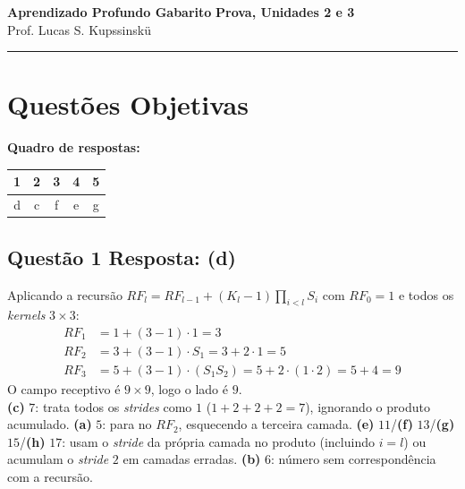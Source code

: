 \documentclass[11pt,a4paper]{article}
\begin{document}
{\Large\bfseries Aprendizado Profundo \textemdash{} Gabarito} \hfill \textbf{Prova, Unidades 2 e 3}\\
Prof. Lucas S. Kupssinskü

\rule{\linewidth}{0.8pt}

\section*{Questões Objetivas}

\textbf{Quadro de respostas:}
\begin{center}
\begin{tabular}{|c|c|c|c|c|}
\hline
1 & 2 & 3 & 4 & 5 \\\hline
d & c & f & e & g \\\hline
\end{tabular}
\end{center}

\color{blue}

\subsection*{Questão 1 \textemdash{} Resposta: (d)}
Aplicando a recursão $RF_l = RF_{l-1} + (K_l - 1)\prod_{i<l} S_i$ com $RF_0 = 1$ e todos os \textit{kernels} $3\times 3$:
\begin{align*}
    RF_1 &= 1 + (3-1)\cdot 1 = 3 \\
    RF_2 &= 3 + (3-1)\cdot S_1 = 3 + 2\cdot 1 = 5 \\
    RF_3 &= 5 + (3-1)\cdot (S_1 S_2) = 5 + 2\cdot(1\cdot 2) = 5 + 4 = 9
\end{align*}
O campo receptivo é $9 \times 9$, logo o lado é $9$.\\
\textbf{(c)} $7$: trata todos os \textit{strides} como $1$ ($1 + 2 + 2 + 2 = 7$), ignorando o produto acumulado.
\textbf{(a)} $5$: para no $RF_2$, esquecendo a terceira camada.
\textbf{(e)} $11$/\textbf{(f)} $13$/\textbf{(g)} $15$/\textbf{(h)} $17$: usam o \textit{stride} da própria camada no produto (incluindo $i = l$) ou acumulam o \textit{stride} $2$ em camadas erradas.
\textbf{(b)} $6$: número sem correspondência com a recursão.
\end{document}
